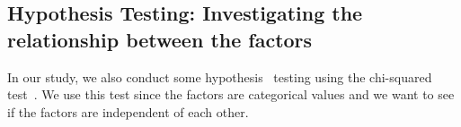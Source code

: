 \documentclass[a4paper,fleqn]{cas-sc}
\begin{document}


\subsection{Hypothesis Testing: Investigating the relationship between the factors}
In our study, we also conduct some hypothesis~\cite{stefanczyk2024cooks} testing using the chi-squared test~\cite{chi}. We use this test since the factors are categorical values and we want to see if the factors are independent of each other.

\end{document}
